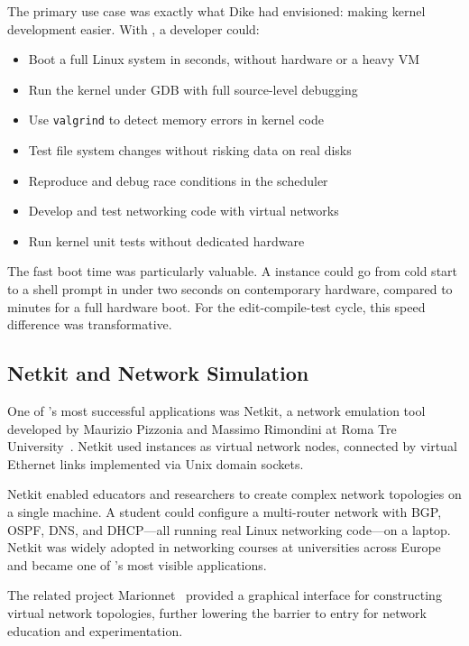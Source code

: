 The primary use case was exactly what Dike had envisioned: making kernel
development easier.  With \UML{}, a developer could:

\begin{itemize}[nosep]
  \item Boot a full Linux system in seconds, without hardware or a heavy VM
  \item Run the kernel under GDB with full source-level debugging
  \item Use \texttt{valgrind} to detect memory errors in kernel code
  \item Test file system changes without risking data on real disks
  \item Reproduce and debug race conditions in the scheduler
  \item Develop and test networking code with virtual networks
  \item Run kernel unit tests without dedicated hardware
\end{itemize}

\noindent
The fast boot time was particularly valuable.  A \UML{} instance could go from
cold start to a shell prompt in under two seconds on contemporary hardware,
compared to minutes for a full hardware boot.  For the edit-compile-test cycle,
this speed difference was transformative.

\subsection{Netkit and Network Simulation}
\label{sec:history-netkit}

One of \UML{}'s most successful applications was Netkit, a network emulation
tool developed by Maurizio Pizzonia and Massimo Rimondini at Roma Tre
University~\cite{pizzonia2008}.  Netkit used \UML{} instances as virtual network
nodes, connected by virtual Ethernet links implemented via Unix domain sockets.

Netkit enabled educators and researchers to create complex network topologies on
a single machine.  A student could configure a multi-router network with BGP,
OSPF, DNS, and DHCP---all running real Linux networking code---on a laptop.
Netkit was widely adopted in networking courses at universities across Europe
and became one of \UML{}'s most visible applications.

The related project Marionnet~\cite{marionnet} provided a graphical interface
for constructing virtual network topologies, further lowering the barrier to
entry for network education and experimentation.

